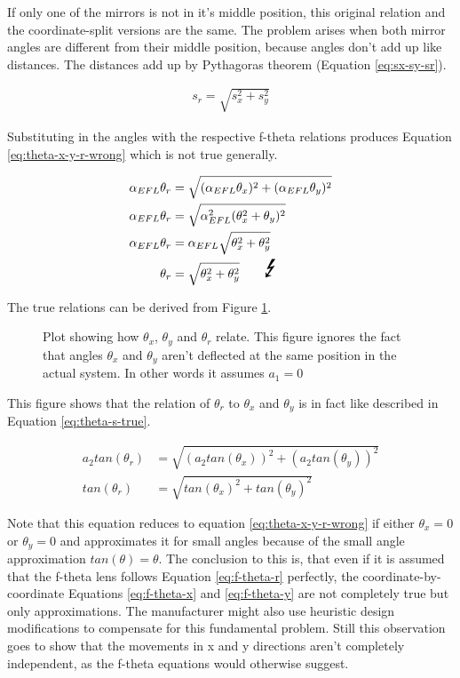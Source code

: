 If only one of the mirrors is not in it's middle position, this original relation and the coordinate-split versions are the same. The problem arises when both mirror angles are different from their middle position, because angles don't add up like distances. The distances add up by Pythagoras theorem (Equation \ref{eq:sx-sy-sr}).

\begin{align}
    s_r = \sqrt{s_x^2 + s_y^2}
    \label{eq:sx-sy-sr}
\end{align}
    
Substituting in the angles with the respective f-theta relations produces Equation \ref{eq:theta-x-y-r-wrong} which is not true generally.
    
\begin{align}
    \alpha_{EFL} \theta_r &= \sqrt{(\alpha_{EFL} \theta_x)^2 + (\alpha_{EFL} \theta_y)^2} \\
    \alpha_{EFL} \theta_r &= \sqrt{\alpha_{EFL}^2(\theta_x^2 + \theta_y)^2} \\
    \alpha_{EFL} \theta_r &= \alpha_{EFL} \sqrt{\theta_x^2 + \theta_y^2} \\
    \theta_r &= \sqrt{\theta_x^2 + \theta_y^2} \qquad \text{\huge \Lightning} \label{eq:theta-x-y-r-wrong}
\end{align}
    
The true relations can be derived from Figure \ref{fig:theta-s-plot}.
    
\begin{figure}[ht]
    \centering
    
    \caption{Plot showing how $\theta_x$, $\theta_y$ and $\theta_r$ relate. This figure ignores the fact that angles $\theta_x$ and $\theta_y$ aren't deflected at the same position in the actual system. In other words it assumes $a_1 = 0$}
    \label{fig:theta-s-plot}
\end{figure}
    
This figure shows that the relation of $\theta_r$ to $\theta_x$ and $\theta_y$ is in fact like described in Equation \ref{eq:theta-s-true}.
    
\begin{align}
    a_2 tan(\theta_r) &= \sqrt{(a_2 tan(\theta_x))^2 + (a_2 tan(\theta_y))^2} \\
    tan(\theta_r) &= \sqrt{tan(\theta_x)^2 + tan(\theta_y)^2}
    \label{eq:theta-s-true}
\end{align}
    
Note that this equation reduces to equation \ref{eq:theta-x-y-r-wrong} if either $\theta_x = 0$ or  $\theta_y = 0$ and approximates it for small angles because of the small angle approximation $tan(\theta) = \theta$. The conclusion to this is, that even if it is assumed that the f-theta lens follows Equation \ref{eq:f-theta-r} perfectly, the coordinate-by-coordinate Equations \ref{eq:f-theta-x} and \ref{eq:f-theta-y} are not completely true but only approximations. The manufacturer might also use heuristic design modifications to compensate for this fundamental problem. Still this observation goes to show that the movements in x and y directions aren't completely independent, as the f-theta equations would otherwise suggest.

